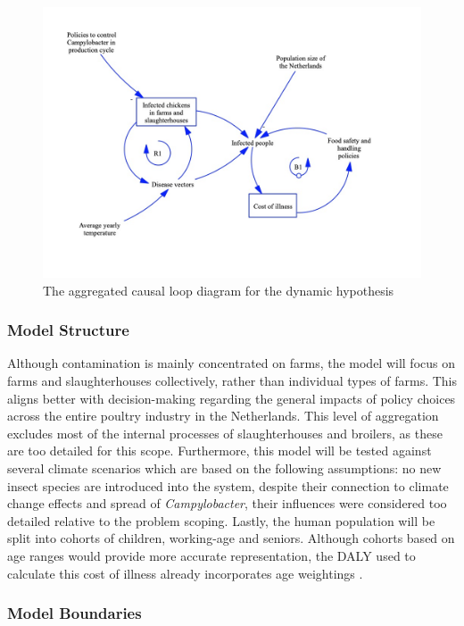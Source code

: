 \begin{figure}[h]
\centering
\includegraphics[width=\textwidth]{images/dynamic_hypo.jpeg}
\caption{The aggregated causal loop diagram for the dynamic hypothesis}
\end{figure}
 
\subsubsection*{Model Structure}
Although contamination is mainly concentrated on farms, the model will focus on farms and slaughterhouses collectively, rather than individual types of farms. This aligns better with decision-making regarding the general impacts of policy choices across the entire poultry industry in the Netherlands. This level of aggregation excludes most of the internal processes of slaughterhouses and broilers, as these are too detailed for this scope. Furthermore, this model will be tested against several climate scenarios which are based on the following assumptions: no new insect species are introduced into the system, despite their connection to climate change effects and spread of \textit{Campylobacter}, their influences were considered too detailed relative to the problem scoping. Lastly, the human population will be split into cohorts of children, working-age and seniors. Although cohorts based on age ranges would provide more accurate representation, the DALY used to calculate this cost of illness already incorporates age weightings \parencite{mangen_campylobacteriosis_2007}. 
\subsubsection*{Model Boundaries}

